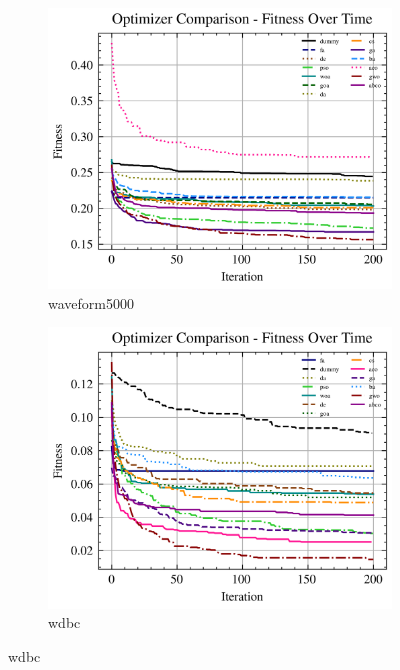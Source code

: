 \begin{figure}[htp]
    \begin{subfigure}[htp]{0.45\textwidth}
        \includegraphics[width=\textwidth]{imagenes/fitness_charts/img/binary/waveform5000/optimizers_fitness_knn.png}
        \caption{waveform5000}
        \label{fig:convergencia_waveform5000_knn}
    \end{subfigure}
    \begin{subfigure}[htp]{0.45\textwidth}
        \includegraphics[width=\textwidth]{imagenes/fitness_charts/img/binary/wdbc/optimizers_fitness_knn.png}
        \caption{wdbc}
        \label{fig:convergencia_wdbc_knn}
    \end{subfigure}


\end{figure}
